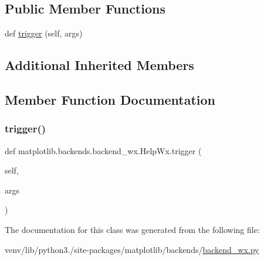 \subsection*{Public Member Functions}
\begin{DoxyCompactItemize}
\item 
def \hyperlink{classmatplotlib_1_1backends_1_1backend__wx_1_1HelpWx_a8c733aa4cb51bc0df83e19b578d1d929}{trigger} (self, args)
\end{DoxyCompactItemize}
\subsection*{Additional Inherited Members}


\subsection{Member Function Documentation}
\mbox{\label{classmatplotlib_1_1backends_1_1backend__wx_1_1HelpWx_a8c733aa4cb51bc0df83e19b578d1d929}} 
\subsubsection{\texorpdfstring{trigger()}{trigger()}}
{\footnotesize\ttfamily def matplotlib.\+backends.\+backend\+\_\+wx.\+Help\+Wx.\+trigger (\begin{DoxyParamCaption}\item[{}]{self,  }\item[{}]{args }\end{DoxyParamCaption})}



The documentation for this class was generated from the following file\+:\begin{DoxyCompactItemize}
\item 
venv/lib/python3./site-\/packages/matplotlib/backends/\hyperlink{backend__wx_8py}{backend\+\_\+wx.\+py}\end{DoxyCompactItemize}
